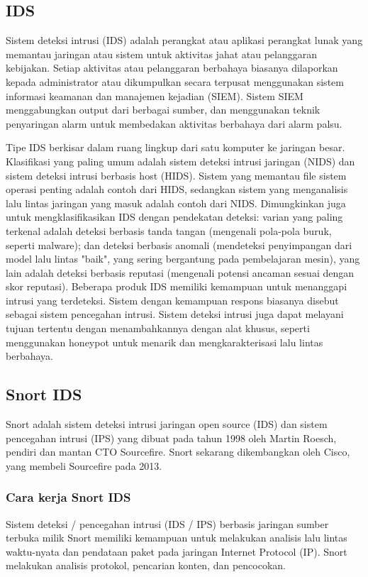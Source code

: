 \documentclass[./skripsi.tex]{subfiles}
\begin{document}
\subsection{IDS}
\par Sistem deteksi intrusi (IDS) adalah perangkat atau aplikasi perangkat lunak yang memantau jaringan atau sistem untuk aktivitas jahat atau pelanggaran kebijakan. Setiap aktivitas atau pelanggaran berbahaya biasanya dilaporkan kepada administrator atau dikumpulkan secara terpusat menggunakan sistem informasi keamanan dan manajemen kejadian (SIEM). Sistem SIEM menggabungkan output dari berbagai sumber, dan menggunakan teknik penyaringan alarm untuk membedakan aktivitas berbahaya dari alarm palsu. \cite{martellini2017cyber}
\par Tipe IDS berkisar dalam ruang lingkup dari satu komputer ke jaringan besar. \cite{axelsson2000intrusion} Klasifikasi yang paling umum adalah sistem deteksi intrusi jaringan (NIDS) dan sistem deteksi intrusi berbasis host (HIDS). Sistem yang memantau file sistem operasi penting adalah contoh dari HIDS, sedangkan sistem yang menganalisis lalu lintas jaringan yang masuk adalah contoh dari NIDS. Dimungkinkan juga untuk mengklasifikasikan IDS dengan pendekatan deteksi: varian yang paling terkenal adalah deteksi berbasis tanda tangan (mengenali pola-pola buruk, seperti malware); dan deteksi berbasis anomali (mendeteksi penyimpangan dari model lalu lintas "baik", yang sering bergantung pada pembelajaran mesin), yang lain adalah deteksi berbasis reputasi (mengenali potensi ancaman sesuai dengan skor reputasi). Beberapa produk IDS memiliki kemampuan untuk menanggapi intrusi yang terdeteksi. Sistem dengan kemampuan respons biasanya disebut sebagai sistem pencegahan intrusi. \cite{newman2009computer} Sistem deteksi intrusi juga dapat melayani tujuan tertentu dengan menambahkannya dengan alat khusus, seperti menggunakan honeypot untuk menarik dan mengkarakterisasi lalu lintas berbahaya.
\cite{liao2013intrusion}
\subsection{Snort IDS}\label{bab2:snortids}
Snort adalah sistem deteksi intrusi jaringan open source (IDS) dan sistem pencegahan intrusi (IPS) \cite{carr2007snort} yang dibuat pada tahun 1998 oleh Martin Roesch, pendiri dan mantan CTO Sourcefire. \cite{greenemeier2006sourcefire} Snort sekarang dikembangkan oleh Cisco, yang membeli Sourcefire pada 2013.
\subsubsection{Cara kerja Snort IDS}\label{bab2:carakerjasnortids}
\par Sistem deteksi / pencegahan intrusi (IDS / IPS) berbasis jaringan sumber terbuka milik Snort memiliki kemampuan untuk melakukan analisis lalu lintas waktu-nyata dan pendataan paket pada jaringan Internet Protocol (IP). Snort melakukan analisis protokol, pencarian konten, dan pencocokan.
\end{document}
